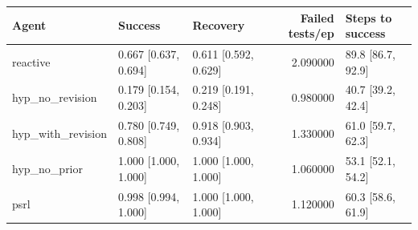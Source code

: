\begin{tabular}{lllrl}
\toprule
Agent & Success & Recovery & Failed tests/ep & Steps to success \\
\midrule
reactive & 0.667 [0.637, 0.694] & 0.611 [0.592, 0.629] & 2.090000 & 89.8 [86.7, 92.9] \\
hyp\_no\_revision & 0.179 [0.154, 0.203] & 0.219 [0.191, 0.248] & 0.980000 & 40.7 [39.2, 42.4] \\
hyp\_with\_revision & 0.780 [0.749, 0.808] & 0.918 [0.903, 0.934] & 1.330000 & 61.0 [59.7, 62.3] \\
hyp\_no\_prior & 1.000 [1.000, 1.000] & 1.000 [1.000, 1.000] & 1.060000 & 53.1 [52.1, 54.2] \\
psrl & 0.998 [0.994, 1.000] & 1.000 [1.000, 1.000] & 1.120000 & 60.3 [58.6, 61.9] \\
\bottomrule
\end{tabular}

